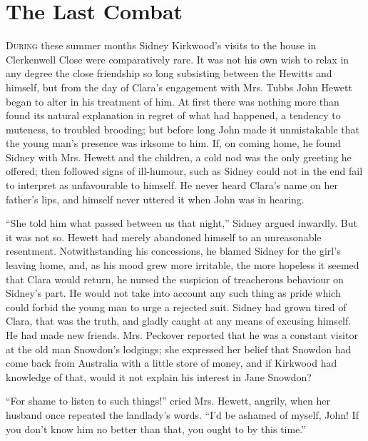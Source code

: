 \chapter{The Last Combat}

\textsc{During} these summer months Sidney Kirkwood's visits to the
house in Clerkenwell Close were comparatively rare. It was not his own
wish to relax in any degree the close friendship so long subsisting
between the Hewitts and himself, but from the day of Clara's engagement
with Mrs. Tubbs John Hewett began to alter in his treatment of him. At
first there was nothing more than found its natural explanation in
regret of what had happened, a tendency to muteness, to troubled
brooding; but before long John made it unmistakable that the young man's
presence was irksome to him. If, on coming home, he found Sidney with
Mrs. Hewett and the children, a cold nod was the only greeting he
offered; then followed signs of ill-humour, {}such as Sidney could not
in the end fail to interpret as unfavourable to himself. He never heard
Clara's name on her father's lips, and himself never uttered it when
John was in hearing.

``She told him what passed between us that night,'' Sidney argued
inwardly. But it was not so. Hewett had merely abandoned himself to an
unreasonable resentment. Notwithstanding his concessions, he blamed
Sidney for the girl's leaving home, and, as his mood grew more
irritable, the more hopeless it seemed that Clara would return, he
nursed the suspicion of treacherous behaviour on Sidney's part. He would
not take into account any such thing as pride which could forbid the
young man to urge a rejected suit. Sidney had grown tired of Clara, that
was the truth, and gladly caught at any means of excusing himself. He
had made new friends. Mrs. Peckover reported that he was a constant
visitor at the old man Snowdon's lodgings; she expressed her belief that
Snowdon had come back from Australia with a little store {}of money, and
if Kirkwood had knowledge of that, would it not explain his interest in
Jane Snowdon?

``For shame to listen to such things!'' cried Mrs. Hewett, angrily, when
her husband once repeated the landlady's words. ``I'd be ashamed of
myself, John! If you don't know him no better than that, you ought to by
this time.''

